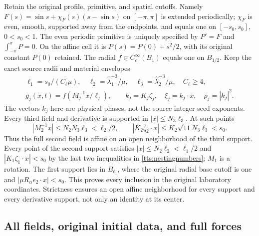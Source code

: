 Retain the original profile, primitive, and spatial cutoffs. Namely
$F(s)=\sin s+\chi_F(s)(s-\sin s)$ on $[-\pi,\pi]$ is
extended periodically; $\chi_F$ is even, smooth, supported away
from the endpoints, and equals one on $[-s_0,s_0]$, $0<s_0<1$.
The even periodic primitive is uniquely specified by $P'=F$ and
$\int_{-\pi}^{\pi}P=0$. On the affine cell it is
$P(s)=P(0)+s^2/2$, with its original constant $P(0)$ retained.
The radial $f\in C_c^\infty(B_1)$ equals one on $B_{1/2}$.
Keep the exact source radii and material envelopes
\begin{equation}\label{tts:envelopes}
 \begin{gathered}
 \ell_1=s_0/(C_\ell\mu),\quad
 \ell_2=\widehat\lambda_1^{-3}/\mu,\quad
 \ell_3=\widehat\lambda_2^{-3}/\mu,\quad C_\ell\geq4,\\
 g_j(x,t)=f(M_j^{-1}x/\ell_j),\qquad
 k_j=K_j\zeta_j,\quad \xi_j=k_j\cdot x,
 \quad\rho_j=|k_j|^2.
 \end{gathered}
\end{equation}
The vectors $k_j$ here are physical phases, not the source integer
seed exponents. Every third field and derivative is supported in
$|x|\leq N_3\ell_3$. At such points
\[
 |M_2^{-1}x|\leq N_2N_3\ell_3<\ell_2/2,\qquad
 |K_2\zeta_2\cdot x|\leq K_2\sqrt{11}N_3\ell_3<s_0.
\]
Thus the full second field is affine on an open neighborhood of
the third support. Every point of the second support satisfies
$|x|\leq N_2\ell_2<\ell_1/2$ and
$|K_1\zeta_1\cdot x|<s_0$ by the last two inequalities in
\eqref{tts:nestingnumbers}; $M_1$ is a rotation. The first
support lies in $B_{\ell_1}$, where the original radial base
cutoff is one and $|\mu R_\alpha e_2\cdot x|<s_0$.
This proves every inclusion in the original laboratory coordinates.
Strictness ensures an open affine neighborhood for every support
and every derivative support, not only an identity at its center.

\subsection{All fields, original initial data, and full forces}

